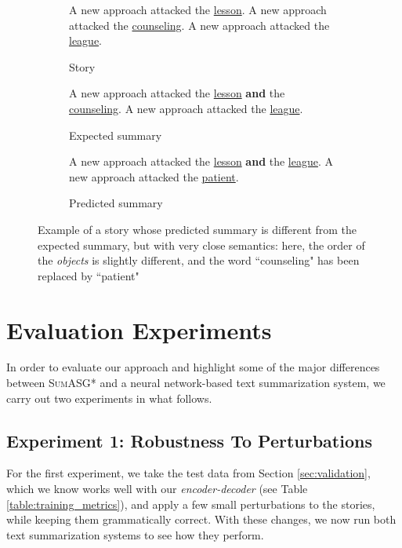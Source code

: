 \begin{figure}[H]
\begin{subfigure}{\textwidth}
\begin{displayquote}
A new approach attacked the \underline{lesson}. A new approach attacked the \underline{counseling}. A new approach attacked the \underline{league}.
\end{displayquote}
\caption{Story}
\vspace{\baselineskip}
\end{subfigure}
\begin{subfigure}{\textwidth}
\begin{displayquote}
A new approach attacked the \underline{lesson} \textbf{and} the \underline{counseling}. A new approach attacked the \underline{league}.
\end{displayquote}
\caption{Expected summary}
\vspace{\baselineskip}
\end{subfigure}
\begin{subfigure}{\textwidth}
\begin{displayquote}
A new approach attacked the \underline{lesson} \textbf{and} the \underline{league}. A new approach attacked the \underline{patient}.
\end{displayquote}
\caption{Predicted summary}
\end{subfigure}
\caption{Example of a story whose predicted summary is different from the expected summary, but with very close semantics: here, the order of the \textit{objects} is slightly different, and the word ``counseling" has been replaced by ``patient"}
\label{fig:discrepancy_example}
\end{figure}

\section{Evaluation Experiments}
\label{sec:evaluation_experiments}

In order to evaluate our approach and highlight some of the major differences between \textsc{SumASG*} and a neural network-based text summarization system, we carry out two experiments in what follows.

\subsection{Experiment 1: Robustness To Perturbations}
\label{subsec:experiment_1}

For the first experiment, we take the test data from Section \ref{sec:validation}, which we know works well with our \textit{encoder-decoder} (see Table \ref{table:training_metrics}), and apply a few small perturbations to the stories, while keeping them grammatically correct. With these changes, we now run both text summarization systems to see how they perform.

